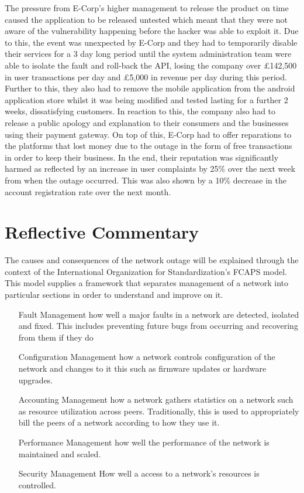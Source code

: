 \documentclass[]{report}
\begin{document}
The pressure from E-Corp's higher management to release the product on time caused the application to be released untested which meant that they were not aware of the vulnerability happening before the hacker was able to exploit it. Due to this, the event was unexpected by E-Corp and they had to temporarily disable their services for a 3 day long period until the system administration team were able to isolate the fault and roll-back the API, losing the company over £142,500 in user transactions per day and £5,000 in revenue per day during this period. Further to this, they also had to remove the mobile application from the android application store whilst it was being modified and tested lasting for a further 2 weeks, dissatisfying customers. In reaction to this, the company also had to release a public apology and explanation to their consumers and the businesses using their payment gateway. On top of this, E-Corp had to offer reparations to the platforms that lost money due to the outage in the form of free transactions in order to keep their business. In the end, their reputation was significantly harmed as reflected by an increase in user complaints by 25\% over the next week from when the outage occurred. This was also shown by a 10\% decrease in the account registration rate over the next month. 

\chapter{Reflective Commentary}

The causes and consequences of the network outage will be explained through the context of the International Organization for Standardization's FCAPS model. This model supplies a framework that separates management of a network into particular sections in order to understand and improve on it.

\begin{itemize}
	\item[Fault Management]
	how well a major faults in a network are detected, isolated and fixed. This includes preventing future bugs from occurring and recovering from them if they do
	\item[Configuration Management]
	how a network controls configuration of the network and changes to it this such as firmware updates or hardware upgrades.
	\item[Accounting Management]
	how a network gathers statistics on a network such as resource utilization across peers. Traditionally, this is used to appropriately bill the peers of a network according to how they use it.
	\item[Performance Management]
	how well the performance of the network is maintained and scaled.
	\item[Security Management]
	How well a access to a network's resources is controlled.
\end{itemize}
\end{document}
